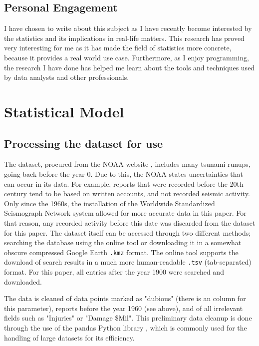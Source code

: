 \documentclass[11pt,letterpaper]{article}
\begin{document}
\subsection{Personal Engagement}

I have chosen to write about this subject as I have recently become interested by the
statistics and its implications in real-life matters. This research has proved very
interesting for me as it has made the field of statistics more concrete, because it provides 
a real world use case. Furthermore, as I enjoy programming, the research I have done 
has helped me learn about the tools and techniques used by data analysts and other professionals.

\section{Statistical Model}

\subsection{Processing the dataset for use}
The dataset, procured from the NOAA website \cite{noaa}, includes many tsunami
runups, going back before the year 0. Due to this, the NOAA states uncertainties
that can occur in its data. For example, reports that were recorded before the
20th century tend to be based on written accounts, and not recorded seismic activity.
Only since the 1960s, the installation of the Worldwide Standardized Seismograph
Network system allowed for more accurate data in this paper. For that reason, any recorded
activity before this date was discarded from the dataset for this paper. The dataset itself can
be accessed through two different methods; searching the database using the online
tool or downloading it in a somewhat obscure compressed Google Earth \verb|.kmz| format. 
The online tool supports the download of search results in a much more human-readable 
\verb|.tsv| (tab-separated) format. For this paper, all entries after the year 1900 were searched and downloaded.

The data is cleaned of data points marked as "dubious" (there is an column for this parameter), 
reports before the year 1960 (see above), and of all irrelevant fields such as "Injuries" 
or "Damage \$Mil". This preliminary data cleanup
is done through the use of the pandas Python library \cite{reback2020pandas}\cite{mckinney-proc-scipy-2010}, 
which is commonly used for the handling of large datasets for its efficiency. 
\end{document}
